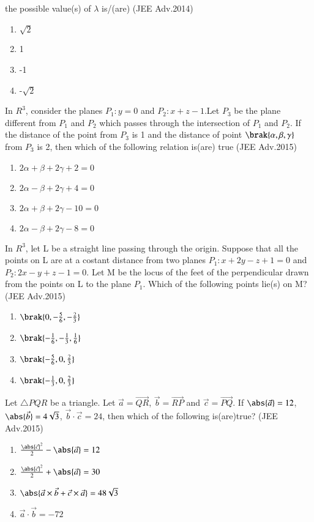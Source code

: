 		the possible value(s) of $\lambda$ is/(are) \hfill{(JEE Adv.2014)}
		\begin{enumerate}
			\item $\sqrt{2}$
			\item 1 
			\item -1 
			\item -$\sqrt{2}$
		\end{enumerate}
	\item In $R^3$, consider the planes $P_1:y=0$ and $P_2:x+z-1$.Let $P_3$ be the plane different from $P_1$ and $P_2$ which passes through the intersection of $P_1$ and $P_2$. If the distance of the
		point from $P_3$ is 1 and the distance of point $\brak{\alpha,\beta,\gamma}$ from $P_3$ is 2,  then which of the following relation is(are) true \hfill{(JEE Adv.2015)}
		\begin{enumerate}
			\item $2\alpha+\beta+2\gamma+2=0$
			\item $2\alpha-\beta+2\gamma+4=0$
			\item $2\alpha+\beta+2\gamma-10=0$
			\item $2\alpha-\beta+2\gamma-8=0$
		\end{enumerate}
	\item In $R^3$, let L be a straight line passing through the origin. Suppose that all the points on L are at a costant distance from two planes $P_1:x+2y-z+1=0$ and $P_2:2x-y+z-1=0$. Let M be the
		locus of the feet of the perpendicular drawn from the points on L to the plane $P_1$. Which of the following points lie(s) on M? \\ \hfill{(JEE Adv.2015)}
		\begin{enumerate}
			\item $\brak{0,-\frac{5}{6},-\frac{2}{3}}$
			\item $\brak{-\frac{1}{6},-\frac{1}{3},\frac{1}{6}}$
			\item $\brak{-\frac{5}{6},0,\frac{2}{3}}$
			\item $\brak{-\frac{1}{3},0,\frac{2}{3}}$
		\end{enumerate}
	\item Let $\triangle PQR$ be a triangle. Let $\vec{a}=\vec{QR}$, $\vec{b}=\vec{RP}$ and $\vec{c}=\vec{PQ}$. If $\abs{\vec{a}}=12$, $\abs{\vec{b}}=4\sqrt{3}$, $\vec{b}
		\cdot \vec{c}=24$, then which of the following is(are)true? \hfill{(JEE Adv.2015)}
		\begin{enumerate}
			\item $\frac{\abs{\vec{c}}^2}{2}-\abs{\vec{a}}=12$
			\item $\frac{\abs{\vec{c}}^2}{2}+\abs{\vec{a}}=30$
			\item $\abs{\vec{a}\times \vec{b}+\vec{c}\times \vec{a}}=48\sqrt{3}$
			\item $\vec{a}\cdot\vec{b}=-72$
		\end{enumerate}
